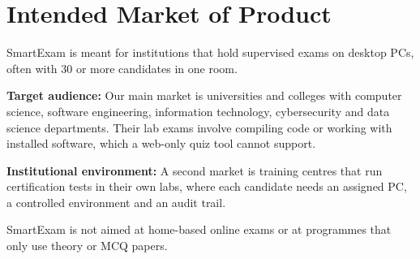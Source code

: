 \section{Intended Market of Product}

SmartExam is meant for institutions that hold supervised exams on desktop PCs, often with 30 or more candidates in one room.

\textbf{Target audience:} Our main market is universities and colleges with computer science, software engineering, information technology, cybersecurity and data science departments. Their lab exams involve compiling code or working with installed software, which a web-only quiz tool cannot support.

\textbf{Institutional environment:} A second market is training centres that run certification tests in their own labs, where each candidate needs an assigned PC, a controlled environment and an audit trail.

SmartExam is not aimed at home-based online exams or at programmes that only use theory or MCQ papers.
